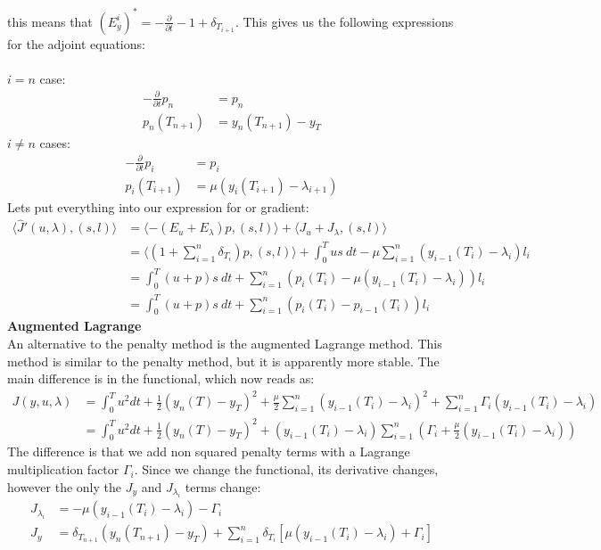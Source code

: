 \documentclass[11pt,a4paper]{report}
\begin{document}
this means that $(E_y^i)^*=-\frac{\partial }{\partial t}-1 + \delta_{T_{i+1}}$. This gives us the following expressions for the adjoint equations:
\\
\\
$i=n$ case:
\begin{align*}
-\frac{\partial }{\partial t}p_n &=p_n  \\
p_n(T_{n+1}) &= y_n(T_{n+1})-y_T
\end{align*}
$i\neq n$ cases:
\begin{align*}
-\frac{\partial }{\partial t}p_i &=p_i  \\
p_i(T_{i+1}) &= \mu(y_{i}(T_{i+1})-\lambda_{i+1} )
\end{align*}
Lets put everything into our expression for or gradient:
\begin{align*}
\langle \hat{J}'(u,\lambda), (s,l)\rangle&=\langle -(E_u+E_{\lambda})p, (s,l)\rangle + \langle J_u+J_{\lambda}, (s,l)\rangle \\
&= \langle (1+\sum_{i=1}^n \delta_{T_i})p , (s,l)\rangle+ \int_0^T us \ dt - \mu \sum_{i=1}^{n}(y_{i-1}(T_i)-\lambda_i)l_i\\
&=\int_0^T (u+p)s \ dt +\sum_{i=1}^n(p_{i}(T_i) -\mu(y_{i-1}(T_i)-\lambda_i) )l_i \\
&= \int_0^T (u+p)s \ dt +\sum_{i=1}^n(p_{i}(T_i) -p_{i-1}(T_i) )l_i
\end{align*} 
\textbf{Augmented Lagrange}
\\
An alternative to the penalty method is the augmented Lagrange method. This method is similar to the penalty method, but it is apparently more stable. The main difference is in the functional, which now reads as:
\begin{align*}
J(y,u,\lambda) &= \int_0^T u^2 dt + \frac{1}{2}(y_n(T)-y_T)^2 + \frac{\mu}{2} \sum_{i=1}^n (y_{i-1}(T_i)-\lambda_i)^2 + \sum_{i=1}^n \Gamma_i(y_{i-1}(T_i)-\lambda_i) \\
&= \int_0^T u^2 dt + \frac{1}{2}(y_n(T)-y_T)^2 +  (y_{i-1}(T_i)-\lambda_i)\sum_{i=1}^n (\Gamma_i+\frac{\mu}{2}(y_{i-1}(T_i)-\lambda_i))
\end{align*}
The difference is that we add non squared penalty terms with a Lagrange multiplication factor $\Gamma_i$. Since we change the functional, its derivative changes, however the only the $J_y$ and $J_{\lambda_i}$ terms change:
\begin{align*}
J_{\lambda_i}&= -\mu(y_{i-1}(T_i)-\lambda_i) -\Gamma_i\\
J_y &= \delta_{T_{n+1}}(y_n(T_{n+1})-y_T) +  \sum_{i=1}^n \delta_{T_{i}}[\mu(y_{i-1}(T_i)-\lambda_i ) + \Gamma_i]
\end{align*}
\end{document}
